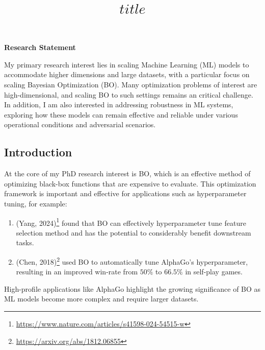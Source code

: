 \documentclass[11pt, a4paper]{article}
\title{$title$}
\begin{document}
\maketitle
\vspace{1em}

{\bf\Large{Research Statement}}

\vspace{1em}

My primary research interest lies in scaling Machine Learning (ML) models to accommodate higher dimensions and large datasets, with a particular focus on scaling Bayesian Optimization (BO). Many optimization problems of interest are high-dimensional, and scaling BO to such settings remains an critical challenge. In addition, I am also interested in addressing robustness in ML systems, exploring how these models can remain effective and reliable under various operational conditions and adversarial scenarios.

\subsection{Introduction}
At the core of my PhD research interest is BO, 
which is an effective method of optimizing black-box functions that are expensive to evaluate.
This optimization framework is important and effective for applications such as hyperparameter tuning, for example:
\begin{enumerate}
  \item (Yang, 2024)\footnote{\url{https://www.nature.com/articles/s41598-024-54515-w}} found that BO can effectively hyperparameter tune feature selection method and has the potential to considerably benefit downstream tasks.
  \item (Chen, 2018)\footnote{\url{https://arxiv.org/abs/1812.06855}} used BO to automatically tune AlphaGo's hyperparameter, resulting in an improved win-rate from \(50\%\) to \(66.5\%\) in self-play games.
\end{enumerate}

High-profile applications like AlphaGo highlight the growing significance of BO as ML models become more complex and require larger datasets.
\end{document}
